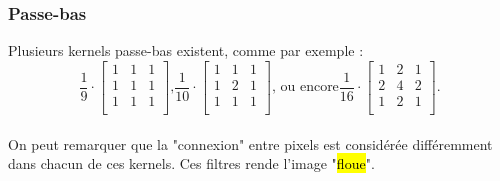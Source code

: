 \documentclass[letterpaper, 12pt]{article}
\newcommand{\alinea}{
\hspace*{0.5cm}}
\begin{document}
		\subsubsection{Passe-bas}
			\alinea Plusieurs kernels passe-bas existent, comme par exemple : \\
				$$\frac{1}{9} \cdot \begin{bmatrix} 1&1&1\\ 1&1&1\\1&1&1\\ \end{bmatrix}\text{,} 
				\frac{1}{10} \cdot \begin{bmatrix} 1&1&1\\ 1&2&1\\1&1&1\\ \end{bmatrix}\text{, ou encore}
				\frac{1}{16} \cdot \begin{bmatrix} 1&2&1\\ 2&4&2\\1&2&1\\ \end{bmatrix}\text{.}$$\\
				On peut remarquer que la "connexion" entre pixels est considérée différemment dans chacun de ces kernels.
				Ces filtres rende l'image "\hl{floue}".
\end{document}
